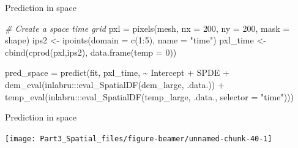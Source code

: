\documentclass[
  ignorenonframetext,
]{beamer}
\newenvironment{Shaded}{\begin{snugshade}}{\end{snugshade}}
\newcommand{\AttributeTok}[1]{\textcolor[rgb]{0.77,0.63,0.00}{#1}}
\newcommand{\CommentTok}[1]{\textcolor[rgb]{0.56,0.35,0.01}{\textit{#1}}}
\newcommand{\DecValTok}[1]{\textcolor[rgb]{0.00,0.00,0.81}{#1}}
\newcommand{\FunctionTok}[1]{\textcolor[rgb]{0.00,0.00,0.00}{#1}}
\newcommand{\NormalTok}[1]{#1}
\newcommand{\OtherTok}[1]{\textcolor[rgb]{0.56,0.35,0.01}{#1}}
\newcommand{\SpecialCharTok}[1]{\textcolor[rgb]{0.00,0.00,0.00}{#1}}
\newcommand{\StringTok}[1]{\textcolor[rgb]{0.31,0.60,0.02}{#1}}
\begin{document}
\begin{frame}[fragile]{Prediction in space}
\tiny

\begin{Shaded}
\begin{Highlighting}[]
\CommentTok{\# Create a space time grid }
\NormalTok{pxl }\OtherTok{=} \FunctionTok{pixels}\NormalTok{(mesh, }\AttributeTok{nx =} \DecValTok{200}\NormalTok{, }\AttributeTok{ny =} \DecValTok{200}\NormalTok{, }\AttributeTok{mask =}\NormalTok{ shape)}
\NormalTok{ips2 }\OtherTok{\textless{}{-}} \FunctionTok{ipoints}\NormalTok{(}\AttributeTok{domain =} \FunctionTok{c}\NormalTok{(}\DecValTok{1}\SpecialCharTok{:}\DecValTok{5}\NormalTok{), }\AttributeTok{name =} \StringTok{"time"}\NormalTok{)}
\NormalTok{pxl\_time }\OtherTok{\textless{}{-}} \FunctionTok{cbind}\NormalTok{(}\FunctionTok{cprod}\NormalTok{(pxl,ips2), }\FunctionTok{data.frame}\NormalTok{(}\AttributeTok{temp =} \DecValTok{0}\NormalTok{))}

\NormalTok{pred\_space }\OtherTok{=} \FunctionTok{predict}\NormalTok{(fit, pxl\_time, }
                      \SpecialCharTok{\textasciitilde{}}\NormalTok{ Intercept }\SpecialCharTok{+}\NormalTok{ SPDE }\SpecialCharTok{+}
                       \FunctionTok{dem\_eval}\NormalTok{(inlabru}\SpecialCharTok{:::}\FunctionTok{eval\_SpatialDF}\NormalTok{(dem\_large,}
\NormalTok{                                                         .data.)) }\SpecialCharTok{+}
                       \FunctionTok{temp\_eval}\NormalTok{(inlabru}\SpecialCharTok{:::}\FunctionTok{eval\_SpatialDF}\NormalTok{(temp\_large,}
\NormalTok{                                                          .data.,}
                                                          \AttributeTok{selector =} \StringTok{"time"}\NormalTok{)))}
\end{Highlighting}
\end{Shaded}

\normalsize
\end{frame}

\begin{frame}{Prediction in space}
\protect\hypertarget{prediction-in-space-1}{}
\begin{center}\texttt{[image: Part3\_Spatial\_files/figure-beamer/unnamed-chunk-40-1]} \end{center}
\end{frame}
\end{document}
